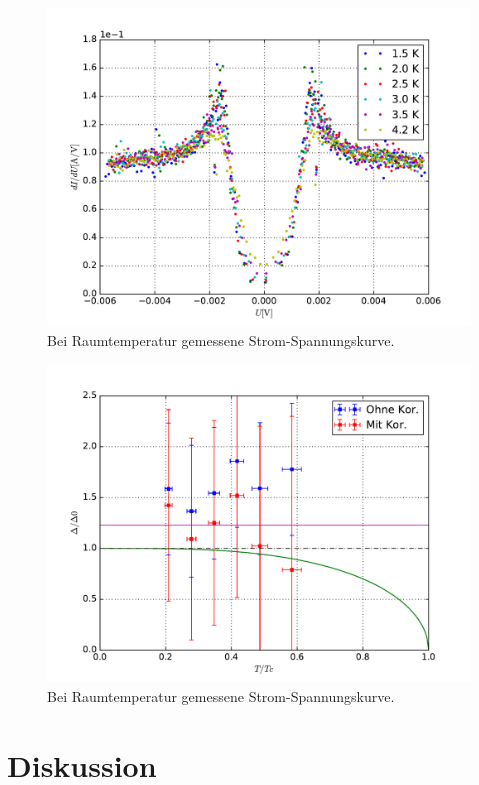 \documentclass[twoside,        %
               BCOR12mm,       %
               english,ngerman, %
               fleqn,headsepline=false,footsepline=false
              ]{Vorlage/MFPREPORT}
\begin{document}
\begin{figure}[]
    \centering
    \includegraphics[width=\textwidth]{fig/3.pdf}
    \caption{Bei Raumtemperatur gemessene Strom-Spannungskurve.}
    \label{fig:3}
\end{figure}
\begin{figure}[]
    \centering
    \includegraphics[width=\textwidth]{fig/4.pdf}
    \caption{Bei Raumtemperatur gemessene Strom-Spannungskurve.}
    \label{fig:4}
\end{figure}


\section{Diskussion}
\end{document}

